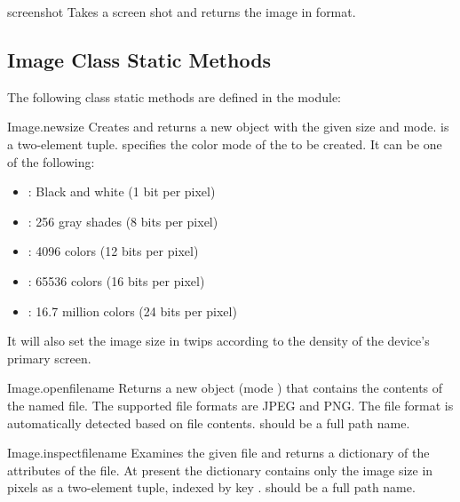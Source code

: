 \begin{funcdesc}{screenshot}{}
Takes a screen shot and returns the image in  format.
\end{funcdesc}

\subsection{Image Class Static Methods}
\label{subsec:image}
The following  class static methods are defined in the 
 module:

\begin{funcdesc}{Image.new}{size}
Creates and returns a new  object with the given size and 
mode.  is a two-element tuple.  specifies the 
color mode of the  to be created. It can be one of the 
following:

\begin{itemize}
\item {}: Black and white (1 bit per pixel)
\item {}: 256 gray shades (8 bits per pixel)
\item {}: 4096 colors (12 bits per pixel)
\item {}: 65536 colors (16 bits per pixel)
\item {}: 16.7 million colors (24 bits per pixel)
\end{itemize}
\notinfirsted
It will also set the image size in twips according to the density of the device's primary screen. 
\end{funcdesc}

\begin{funcdesc}{Image.open}{filename}
\notinfirsted
Returns a new  object (mode ) that contains the 
contents of the named file. The supported file formats are JPEG and PNG. The 
file format is automatically detected based on file contents. 
 should be a full path name.
\end{funcdesc}

\begin{funcdesc}{Image.inspect}{filename}
\notinfirsted
Examines the given file and returns a dictionary of the attributes of the 
file. At present the dictionary contains only the image size in pixels as a 
two-element tuple, indexed by key . 
 should be a full path name.
\end{funcdesc}


